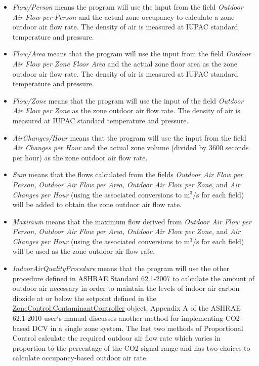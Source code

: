\begin{itemize}
\tightlist

\item  \emph{Flow/Person} means the program will use the input from the field \emph{Outdoor Air Flow per Person} and the actual zone occupancy to calculate a zone outdoor air flow rate. The density of air is measured at IUPAC standard temperature and pressure.

\item  \emph{Flow/Area} means that the program will use the input from the field \emph{Outdoor Air Flow per Zone Floor Area} and the actual zone floor area as the zone outdoor air flow rate.  The density of air is measured at IUPAC standard temperature and pressure.

\item  \emph{Flow/Zone} means that the program will use the input of the field \emph{Outdoor Air Flow per Zone} as the zone outdoor air flow rate. The density of air is measured at IUPAC standard temperature and pressure.

\item  \emph{AirChanges/Hour} means that the program will use the input from the field \emph{Air Changes per Hour} and the actual zone volume (divided by 3600 seconds per hour) as the zone outdoor air flow rate.

\item  \emph{Sum} means that the flows calculated from the fields \emph{Outdoor Air Flow per Person,} \emph{Outdoor Air Flow per Area, Outdoor Air Flow per Zone}, and \emph{Air Changes per Hour} (using the associated conversions to m\(^{3}\)/s for each field) will be added to obtain the zone outdoor air flow rate.

\item  \emph{Maximum} means that the maximum flow derived from \emph{Outdoor Air Flow per Person,} \emph{Outdoor Air Flow per Area, Outdoor Air Flow per Zone,} and \emph{Air Changes per Hour} (using the associated conversions to m\(^{3}\)/s for each field) will be used as the zone outdoor air flow rate.

\item  \emph{IndoorAirQualityProcedure} means that the program will use the other procedure defined in ASHRAE Standard 62.1-2007 to calculate the amount of outdoor air necessary in order to maintain the levels of indoor air carbon dioxide at or below the setpoint defined in the \hyperref[zonecontrolcontaminantcontroller]{ZoneControl:ContaminantController} object. Appendix A of the ASHRAE 62.1-2010 user\('\)s manual discusses another method for implementing CO2-based DCV in a single zone system. The last two methods of Proportional Control calculate the required outdoor air flow rate which varies in proportion to the percentage of the CO2 signal range and has two choices to calculate occupancy-based outdoor air rate.


\end{itemize}

